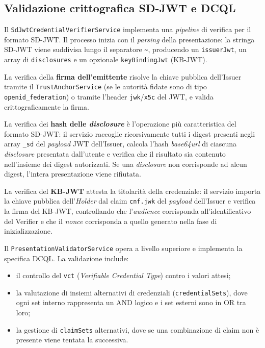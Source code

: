\subsection{Validazione crittografica SD-JWT e DCQL}
Il \texttt{SdJwtCredentialVerifierService} implementa una \textit{pipeline} di verifica per il formato SD-JWT. Il processo inizia con il \textit{parsing} della presentazione: la stringa SD-JWT viene suddivisa lungo il separatore \texttt{\textasciitilde}, producendo un \texttt{issuerJwt}, un array di \texttt{disclosures} e un opzionale \texttt{keyBindingJwt} (KB-JWT).

La verifica della \textbf{firma dell'emittente} risolve la chiave pubblica dell'Issuer tramite il \texttt{TrustAnchorService} (se le autorità fidate sono di tipo \texttt{openid\_\allowbreak{}federation}) o tramite l'header \texttt{jwk}/\texttt{x5c} del JWT, e valida crittograficamente la firma.

La verifica dei \textbf{hash delle \textit{disclosure}} è l'operazione più caratteristica del formato SD-JWT: il servizio raccoglie ricorsivamente tutti i digest presenti negli array \texttt{\_\allowbreak{}sd} del \textit{payload} JWT dell'Issuer, calcola l'hash \textit{base64url} di ciascuna \textit{disclosure} presentata dall'utente e verifica che il risultato sia contenuto nell'insieme dei digest autorizzati. Se una \textit{disclosure} non corrisponde ad alcun digest, l'intera presentazione viene rifiutata.

La verifica del \textbf{KB-JWT} attesta la titolarità della credenziale: il servizio importa la chiave pubblica dell'\textit{Holder} dal claim \texttt{cnf.jwk} del \textit{payload} dell'Issuer e verifica la firma del KB-JWT, controllando che l'\textit{audience} corrisponda all'identificativo del Verifier e che il \textit{nonce} corrisponda a quello generato nella fase di inizializzazione.

Il \texttt{PresentationValidatorService} opera a livello superiore e implementa la specifica DCQL. La validazione include:
\begin{itemize}
    \item il controllo del \texttt{vct} (\textit{Verifiable Credential Type}) contro i valori attesi;
    \item la valutazione di insiemi alternativi di credenziali (\texttt{credentialSets}), dove ogni set interno rappresenta un AND logico e i set esterni sono in OR tra loro;
    \item la gestione di \texttt{claimSets} alternativi, dove se una combinazione di claim non è presente viene tentata la successiva.
\end{itemize}


